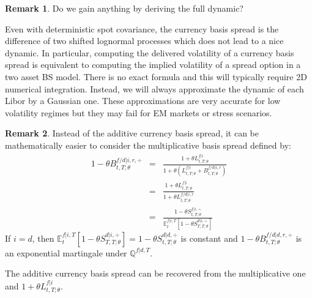 \documentclass[11pt,english]{amsart}
\newcommand{\EE}{\mathbb{E}}
\newcommand{\QQ}{\mathbb{Q}}
\theoremstyle{definition}
\newtheorem{rema}{Remark}
\begin{document}
\begin{rema}
Do we gain anything by deriving the full dynamic?

Even with deterministic spot covariance, the currency basis spread is the difference of two shifted lognormal processes which does not lead to a nice dynamic. In particular, computing the delivered volatility of a currency basis spread is equivalent to computing the implied volatility of a spread option in a two asset BS model. There is no exact formula and this will typically require 2D numerical integration. Instead, we will always approximate the dynamic of each Libor by a Gaussian one. These approximations are very accurate for low volatility regimes but they may fail for EM markets or stress scenarios.
\end{rema}





\begin{rema}
Instead of the additive currency basis spread, it can be mathematically easier to consider the multiplicative basis spread defined by:
\begin{eqnarray}
  1 - \theta B^{f/d|i,r,\div}_{t,T;\theta} 
  &=& \frac{ 1+\theta L^{f|i}_{t,T;\theta}}{1+\theta (L^{f|i}_{t,T;\theta} + B^{f/d|i,r}_{t,T;\theta})}  \\
  &=& \frac{ 1+\theta L^{f|i}_{t,T;\theta}}{1+\theta L^{f/d|i,r}_{t,T;\theta}}  \\
  &=& \frac{1-\theta S^{f|i,\div}_{t,T;\theta} } { \EE^{f|i,T}_t \left[  1-\theta S^{d|i,\div}_{T,T;\theta} \right] }  \end{eqnarray} 
If $i = d$, then $\EE^{f|i,T}_t \left[  1-\theta S^{d|i,\div}_{T,T;\theta} \right] = 1-\theta S^{d|d,\div}_{t,T;\theta}$ is constant and $1 - \theta B^{f/d|d,r,\div}_{t,T;\theta}$ is an exponential martingale under $\QQ^{f|d,T}$. 

The additive currency basis spread can be recovered from the multiplicative one and $1+\theta L^{f|i}_{t,T;\theta}$. 
\end{rema}
\end{document}
